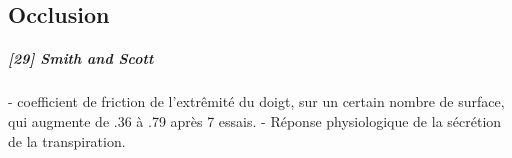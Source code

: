 
\subsection{Occlusion}

\subparagraph{[29] Smith and Scott} 
- coefficient de friction de l'extr\^emit\'e du doigt, sur un certain nombre de surface, qui augmente de .36 \`a .79 apr\`es 7 essais.
- R\'eponse physiologique de la s\'ecr\'etion de la transpiration.




